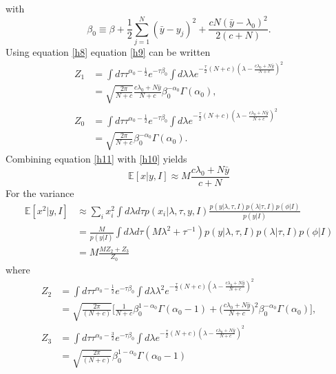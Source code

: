 with 
\begin{equation}
	\beta_0\equiv \beta+\frac{1}{2}\sum_{j=1}^{N}(\bar{y}-y_j)^2+\frac{cN(\bar{y}-\lambda_0)^2}{2(c+N)}.
\end{equation}
Using equation \eqref{h8} equation \eqref{h9} can be written
\begin{equation}
	\begin{split}
		Z_1 &= \int d\tau \tau^{\alpha_0-\frac{1}{2}}e^{-\tau\beta_0} \int d\lambda \lambda e^{-\frac{\tau}{2}(N+c)(\lambda-\frac{c\lambda_0+N\bar{y}}{N+c})^2}\\
		&=\sqrt{\frac{2\pi}{N+c}}\frac{c\lambda_0+N\bar{y}}{N+c}\beta_0^{-\alpha_0}\Gamma(\alpha_0), \\ 
		Z_0 &= \int d\tau \tau^{\alpha_0-\frac{1}{2}}e^{-\tau\beta_0} \int d\lambda e^{-\frac{\tau}{2}(N+c)(\lambda-\frac{c\lambda_0+N\bar{y}}{N+c})^2}\\
		&=\sqrt{\frac{2\pi}{N+c}}\beta_0^{-\alpha_0}\Gamma(\alpha_0).
	\end{split}
	\label{h10}
\end{equation} 
Combining equation \eqref{h11} with \eqref{h10} yields
\begin{equation}
	\mathbb{E}[x|y,I]\approx M\frac{c\lambda_0+N\bar{y}}{c+N}
\end{equation}
For the variance
\begin{equation}
	\begin{split}
		\mathbb{E}[x^2|y,I] &\approx \sum_i x_i^2\int d\lambda d\tau p(x_i|\lambda,\tau,y,I)\frac{p(y|\lambda,\tau,I)p(\lambda|\tau,I)p(\phi|I)}{p(y|I)}\\
		&=\frac{M}{p(y|I)}\int d\lambda d\tau (M\lambda^2+\tau^{-1}) p(y|\lambda,\tau,I)p(\lambda|\tau,I)p(\phi|I)\\
		&=M\frac{MZ_2+Z_3}{Z_0}
	\end{split}
	\label{h12}
\end{equation}
where
\begin{equation}
	\begin{split}
		Z_2 &= \int d\tau \tau^{\alpha_0-\frac{1}{2}}e^{-\tau\beta_0} \int d\lambda \lambda^2 e^{-\frac{\tau}{2}(N+c)(\lambda-\frac{c\lambda_0+N\bar{y}}{N+c})^2}\\
		& = \sqrt{\frac{2\pi}{(N+c)}}\bigg[\frac{1}{N+c}\beta_0^{1-\alpha_0}\Gamma(\alpha_0-1)+\bigg(\frac{c\lambda_0+N\bar{y}}{N+c}\bigg)^2\beta_0^{-\alpha_0}\Gamma(\alpha_0) \bigg],\\
		Z_3 &= \int d\tau \tau^{\alpha_0-\frac{3}{2}}e^{-\tau\beta_0} \int d\lambda  e^{-\frac{\tau}{2}(N+c)(\lambda-\frac{c\lambda_0+N\bar{y}}{N+c})^2}\\
		&=\sqrt{\frac{2\pi}{(N+c)}}\beta_0^{1-\alpha_0}\Gamma(\alpha_0-1)
	\end{split}
	\label{h13}
\end{equation}
